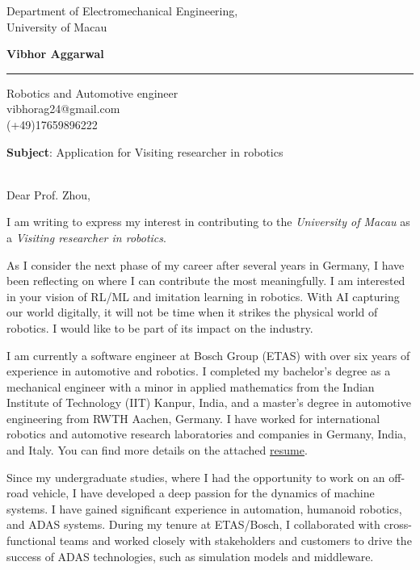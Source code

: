 \documentclass[a4paper,10 pt]{letter} %
\date{\today} %
\begin{document}
\renewcommand{\enclname}{Enclosed}
\longindentation=0pt                       %
\let\raggedleft\raggedright                %


\begin{letter}
{Department of Electromechanical Engineering, \\
University of Macau
}
\begin{center}
{\large\bf Vibhor Aggarwal}
\end{center}
\medskip\hrule height 1pt
\begin{center}
{Robotics and Automotive engineer  \\  vibhorag24@gmail.com\\ (+49)17659896222}
\end{center} \vfill %

\textbf{Subject}: Application for Visiting researcher in robotics \\ \\
\opening{Dear Prof. Zhou,}

I am writing to express my interest in contributing to the \textit{University of Macau} as a \textit{Visiting researcher in robotics}.

As I consider the next phase of my career after several years in Germany, I have been reflecting on where I can contribute the most meaningfully. I am interested in your vision of RL/ML and imitation learning in robotics. With AI capturing our world digitally, it will not be time when it strikes the physical world of robotics. I would like to be part of its impact on the industry.

I am currently a software engineer at Bosch Group (ETAS) with over six years of experience in automotive and robotics. I completed my bachelor's degree as a mechanical engineer with a minor in applied mathematics from the Indian Institute of Technology (IIT) Kanpur, India, and a master's degree in automotive engineering from RWTH Aachen, Germany. I have worked for international robotics and automotive research laboratories and companies in Germany, India, and Italy. You can find more details on the attached \href{https://vibhoraggarwal.github.io/files/VibhorResume_en.pdf}{resume}.

Since my undergraduate studies, where I had the opportunity to work on an off-road vehicle, I have developed a deep passion for the dynamics of machine systems. I have gained significant experience in automation, humanoid robotics, and ADAS systems. During my tenure at ETAS/Bosch, I collaborated with cross-functional teams and worked closely with stakeholders and customers to drive the success of ADAS technologies, such as simulation models and middleware.


\end{letter}
\end{document}
